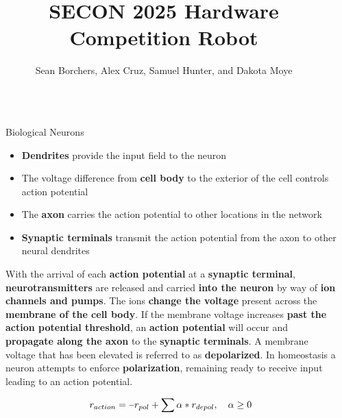 \documentclass[final]{beamer}
\title{SECON 2025 Hardware Competition Robot}
\author{Sean Borchers, Alex Cruz, Samuel Hunter, and Dakota Moye}
\institute[shortinst]{Tennessee Technological University}
\newlength{\sepwidth}
\newlength{\colwidth}
\newcommand{\separatorcolumn}{\begin{column}{\sepwidth}\end{column}}
\newcommand{\minus}{\scalebox{0.75}[1.0]{$-$}}
\begin{document}
\begin{frame}[t]
\begin{columns}[t]
\separatorcolumn

\begin{column}{\colwidth}

  \begin{block}{Biological Neurons}


    \begin{itemize}
      \item \textbf{Dendrites} provide the input field to the neuron
      \item The voltage difference from \textbf{cell body} to the exterior of the cell controls action potential
      \item The \textbf{axon} carries the action potential to other locations in the network
      \item \textbf{Synaptic terminals} transmit the action potential from the axon to other neural dendrites

    \end{itemize}

    With the arrival of each \textbf{action potential} at a \textbf{synaptic terminal}, \textbf{neurotransmitters} are released and carried \textbf{into the neuron} by way of \textbf{ion channels and pumps}. The ions \textbf{change the voltage} present across the \textbf{membrane of the cell body}. If the membrane voltage increases \textbf{past the action potential threshold}, an \textbf{action potential} will occur and \textbf{propagate along the axon} to the \textbf{synaptic terminals}. A membrane voltage that has been elevated is referred to as \textbf{depolarized}. In homeostasis a neuron attempts to enforce \textbf{polarization}, remaining ready to receive input leading to an action potential. 

    \begin{equation}
      \label{Formula:Neuron1}
      r_{action} = \minus r_{pol} + \sum  \alpha * r_{depol}, \quad \alpha \geq 0
    \end{equation}


\end{block}
\end{column}
\end{columns}
\end{frame}
\end{document}
